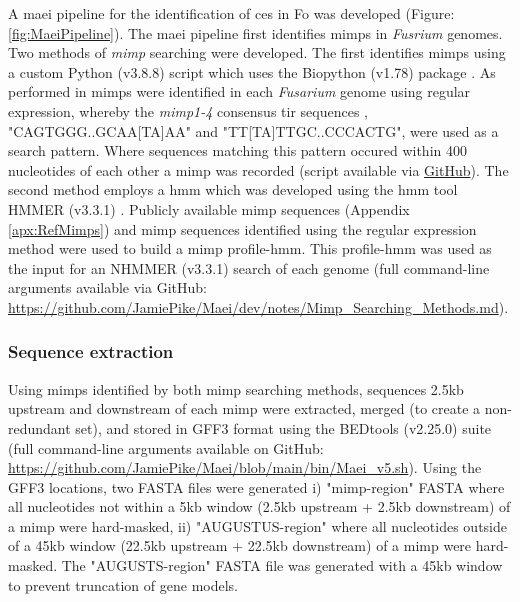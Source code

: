 A \acf{maei} pipeline for the identification of \acp{ce} in \ac{Fo} was developed (Figure: \ref{fig:MaeiPipeline}). The \ac{maei} pipeline first identifies \acp{mimp} in \textit{Fusrium} genomes. Two methods of \textit{mimp} searching were developed. The first identifies \acp{mimp} using a custom Python (v3.8.8) script \parencite{Python} which uses the Biopython (v1.78) package \parencite{biopython}. As performed in \textcite{Schmidt2013, Dam2016, Armitage2018} \acp{mimp} were identified in each \textit{Fusarium} genome using regular expression, whereby the \textit{mimp1-4} consensus \ac{tir} sequences \parencite{Bergemann2008, Schmidt2013}, "CAGTGGG..GCAA[TA]AA" and "TT[TA]TTGC..CCCACTG", were used as a search pattern. Where sequences matching this pattern occured within 400 nucleotides of each other a \ac{mimp} was recorded (script available via \href{https://github.com/JamiePike/Maei/blob/main/bin/Mimp_finditer.py}{GitHub}). The second method employs a \acf{hmm} which was developed using the \ac{hmm} tool HMMER (v3.3.1) \parencite{Eddy2011}. Publicly available \ac{mimp} sequences (Appendix \ref{apx:RefMimps}) and \ac{mimp} sequences identified using the regular expression method were used to build a \ac{mimp} profile-\ac{hmm}. This profile-\ac{hmm} was used as the input for an NHMMER (v3.3.1) \parencite{Eddy2011} search of each genome (full command-line arguments available via GitHub: \href{https://github.com/JamiePike/Maei/blob/main/dev/notes/Mimp_Searching_Methods.md}{https://github.com/JamiePike/Maei/dev/notes/Mimp\_Searching\_Methods.md}).

\subsubsection{Sequence extraction}

Using \acp{mimp} identified by both \ac{mimp} searching methods, sequences 2.5kb upstream and downstream of each \ac{mimp} were extracted, merged (to create a non-redundant set), and stored in GFF3 format using the BEDtools (v2.25.0) suite \parencite{Quinlan2010} (full command-line arguments available on GitHub: \href{https://github.com/JamiePike/Maei/blob/main/bin/Maei_v5.sh}{https://github.com/JamiePike/Maei/bl\-ob/main/bin/Maei\_v5.sh}). Using the GFF3 locations, two FASTA files were generated i) "\ac{mimp}-region" FASTA where all nucleotides not within a 5kb window (2.5kb upstream + 2.5kb downstream) of a \ac{mimp} were hard-masked, ii) "AUGUSTUS-region" where all nucleotides outside of a 45kb window (22.5kb upstream + 22.5kb downstream) of a \ac{mimp} were hard-masked. The "AUGUSTS-region" FASTA file was generated with a 45kb window to prevent truncation of gene models. 

